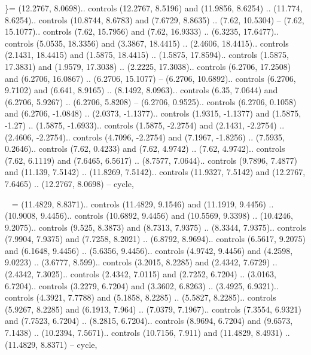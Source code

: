 \}= {(12.2767, 8.0698).. controls (12.2767, 8.5196) and (11.9856, 8.6254) .. (11.774, 8.6254).. controls (10.8744, 8.6783) and (7.6729, 8.8635) .. (7.62, 10.5304) -- (7.62, 15.1077).. controls (7.62, 15.7956) and (7.62, 16.9333) .. (6.3235, 17.6477).. controls (5.0535, 18.3356) and (3.3867, 18.4415) .. (2.4606, 18.4415).. controls (2.1431, 18.4415) and (1.5875, 18.4415) .. (1.5875, 17.8594).. controls (1.5875, 17.3831) and (1.9579, 17.3038) .. (2.2225, 17.3038).. controls (6.2706, 17.2508) and (6.2706, 16.0867) .. (6.2706, 15.1077) -- (6.2706, 10.6892).. controls (6.2706, 9.7102) and (6.641, 8.9165) .. (8.1492, 8.0963).. controls (6.35, 7.0644) and (6.2706, 5.9267) .. (6.2706, 5.8208) -- (6.2706, 0.9525).. controls (6.2706, 0.1058) and (6.2706, -1.0848) .. (2.0373, -1.1377).. controls (1.9315, -1.1377) and (1.5875, -1.27) .. (1.5875, -1.6933).. controls (1.5875, -2.2754) and (2.1431, -2.2754) .. (2.4606, -2.2754).. controls (4.7096, -2.2754) and (7.1967, -1.8256) .. (7.5935, 0.2646).. controls (7.62, 0.4233) and (7.62, 4.9742) .. (7.62, 4.9742).. controls (7.62, 6.1119) and (7.6465, 6.5617) .. (8.7577, 7.0644).. controls (9.7896, 7.4877) and (11.139, 7.5142) .. (11.8269, 7.5142).. controls (11.9327, 7.5142) and (12.2767, 7.6465) .. (12.2767, 8.0698) -- cycle},

~ = {(11.4829, 8.8371).. controls (11.4829, 9.1546) and (11.1919, 9.4456) .. (10.9008, 9.4456).. controls (10.6892, 9.4456) and (10.5569, 9.3398) .. (10.4246, 9.2075).. controls (9.525, 8.3873) and (8.7313, 7.9375) .. (8.3344, 7.9375).. controls (7.9904, 7.9375) and (7.7258, 8.2021) .. (6.8792, 8.9694).. controls (6.5617, 9.2075) and (6.1648, 9.4456) .. (5.6356, 9.4456).. controls (4.9742, 9.4456) and (4.2598, 9.0223) .. (3.6777, 8.599).. controls (3.2015, 8.2285) and (2.4342, 7.6729) .. (2.4342, 7.3025).. controls (2.4342, 7.0115) and (2.7252, 6.7204) .. (3.0163, 6.7204).. controls (3.2279, 6.7204) and (3.3602, 6.8263) .. (3.4925, 6.9321).. controls (4.3921, 7.7788) and (5.1858, 8.2285) .. (5.5827, 8.2285).. controls (5.9267, 8.2285) and (6.1913, 7.964) .. (7.0379, 7.1967).. controls (7.3554, 6.9321) and (7.7523, 6.7204) .. (8.2815, 6.7204).. controls (8.9694, 6.7204) and (9.6573, 7.1438) .. (10.2394, 7.5671).. controls (10.7156, 7.911) and (11.4829, 8.4931) .. (11.4829, 8.8371) -- cycle},
